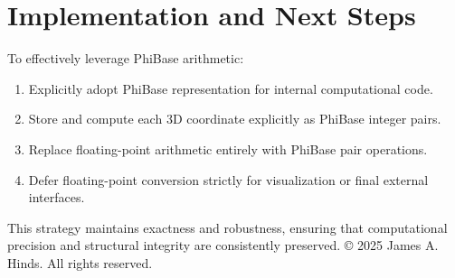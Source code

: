 \documentclass{article}
\begin{document}
\section*{Implementation and Next Steps}

To effectively leverage PhiBase arithmetic:
\begin{enumerate}
\item Explicitly adopt PhiBase representation for internal computational code.
\item Store and compute each 3D coordinate explicitly as PhiBase integer pairs.
\item Replace floating-point arithmetic entirely with PhiBase pair operations.
\item Defer floating-point conversion strictly for visualization or final external interfaces.
\end{enumerate}

This strategy maintains exactness and robustness, ensuring that computational precision and structural integrity are consistently preserved.
\vfill
\smallskip
\noindent\small © 2025 James A. Hinds. All rights reserved.
\end{document}
